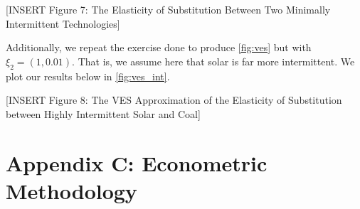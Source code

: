 \documentclass[11pt,a4paper,leqno]{extarticle}
\begin{document}
	
	
	\vspace{0.15in}
	\begin{center}
		[INSERT Figure 7: The Elasticity of Substitution Between Two  Minimally Intermittent Technologies]
	\end{center}
	\vspace{0.15in}
	
	
	Additionally, we repeat the exercise done to produce \autoref{fig:ves} but with $\xi_2 = (1, 0.01)$. That is, we assume here that solar is far more intermittent. We plot our results below in 	\autoref{fig:ves_int}.
	
	
	\vspace{0.15in}
	\begin{center}
		[INSERT Figure 8: The VES Approximation of the Elasticity of Substitution between Highly Intermittent Solar and Coal]
	\end{center}
	\vspace{0.15in}
	
	
	\pagebreak
	
	\section{Appendix C: Econometric Methodology}
	\label{sec:AppendixC}
	
\end{document}
